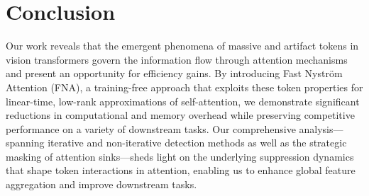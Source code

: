 \section{Conclusion}
\label{sec:conclusion}
Our work reveals that the emergent phenomena of massive and artifact tokens in vision transformers govern the information flow through attention mechanisms and present an opportunity for efficiency gains. By introducing Fast Nystr\"om Attention (FNA), a training-free approach that exploits these token properties for linear-time, low-rank approximations of self-attention, we demonstrate significant reductions in computational and memory overhead while preserving competitive performance on a variety of downstream tasks. Our comprehensive analysis—spanning iterative and non-iterative detection methods as well as the strategic masking of attention sinks—sheds light on the underlying suppression dynamics that shape token interactions in attention, enabling us to enhance global feature aggregation and improve downstream tasks.



